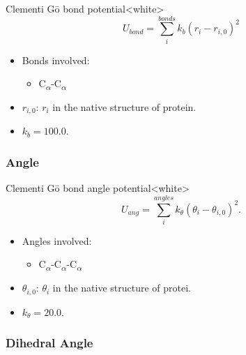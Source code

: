 \begin{smallpage}{Clementi G\={o} bond potential}<white>
  \begin{equation}
    \label{eq:protein_cc_go_local_bond}
    U_{bond} = \sum_{i}^{bonds} k_b (r_i - r_{i,0})^2
  \end{equation}
  \tcblower
  \begin{itemize}
  \item Bonds involved:
    \begin{itemize}
    \item C\textsubscript{$\alpha$}-C\textsubscript{$\alpha$}
    \end{itemize}
  \item $r_{i, 0}$: $r_{i}$ in the native structure of protein.
  \item $k_b = 100.0$.
  \end{itemize}
\end{smallpage}


\subsubsection{Angle}
\label{sec:protein_cc_go_potential_angle}

\begin{smallpage}{Clementi G\={o} bond angle potential}<white>
  \begin{equation}
    \label{eq:protein_cc_go_local_angle}
    U_{ang} = \sum_{i}^{angles} k_\theta (\theta_i - \theta_{i,0})^2.
  \end{equation}
  \tcblower
  \begin{itemize}
  \item Angles involved:
    \begin{itemize}
    \item C\textsubscript{$\alpha$}-C\textsubscript{$\alpha$}-C\textsubscript{$\alpha$}
    \end{itemize}
  \item $\theta_{i, 0}$: $\theta_{i}$ in the native structure of protei.
  \item $k_\theta = 20.0$.
  \end{itemize}
\end{smallpage}


\subsubsection{Dihedral Angle}
\label{sec:protein_cc_go_potential_dihedral_angle}

